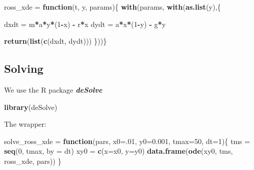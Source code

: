 \documentclass[
]{book}
\newenvironment{Shaded}{\begin{snugshade}}{\end{snugshade}}
\newcommand{\AttributeTok}[1]{\textcolor[rgb]{0.13,0.29,0.53}{#1}}
\newcommand{\ControlFlowTok}[1]{\textcolor[rgb]{0.13,0.29,0.53}{\textbf{#1}}}
\newcommand{\DecValTok}[1]{\textcolor[rgb]{0.00,0.00,0.81}{#1}}
\newcommand{\FloatTok}[1]{\textcolor[rgb]{0.00,0.00,0.81}{#1}}
\newcommand{\FunctionTok}[1]{\textcolor[rgb]{0.13,0.29,0.53}{\textbf{#1}}}
\newcommand{\NormalTok}[1]{#1}
\newcommand{\OtherTok}[1]{\textcolor[rgb]{0.56,0.35,0.01}{#1}}
\newcommand{\SpecialCharTok}[1]{\textcolor[rgb]{0.81,0.36,0.00}{\textbf{#1}}}
\begin{document}
\begin{Shaded}
\begin{Highlighting}[]
\NormalTok{ross\_xde }\OtherTok{=} \ControlFlowTok{function}\NormalTok{(t, y, params)\{}
  \FunctionTok{with}\NormalTok{(params, }\FunctionTok{with}\NormalTok{(}\FunctionTok{as.list}\NormalTok{(y),\{}
    
\NormalTok{  dxdt }\OtherTok{=}\NormalTok{ m}\SpecialCharTok{*}\NormalTok{a}\SpecialCharTok{*}\NormalTok{y}\SpecialCharTok{*}\NormalTok{(}\DecValTok{1}\SpecialCharTok{{-}}\NormalTok{x) }\SpecialCharTok{{-}}\NormalTok{ r}\SpecialCharTok{*}\NormalTok{x}
\NormalTok{  dydt }\OtherTok{=}\NormalTok{ a}\SpecialCharTok{*}\NormalTok{x}\SpecialCharTok{*}\NormalTok{(}\DecValTok{1}\SpecialCharTok{{-}}\NormalTok{y) }\SpecialCharTok{{-}}\NormalTok{ g}\SpecialCharTok{*}\NormalTok{y}
  
  \FunctionTok{return}\NormalTok{(}\FunctionTok{list}\NormalTok{(}\FunctionTok{c}\NormalTok{(dxdt, dydt)))}
\NormalTok{\}))\}}
\end{Highlighting}
\end{Shaded}

\subsection{Solving}\label{solving}

We use the R package \textbf{\emph{deSolve}}

\begin{Shaded}
\begin{Highlighting}[]
\FunctionTok{library}\NormalTok{(deSolve)}
\end{Highlighting}
\end{Shaded}

The wrapper:

\begin{Shaded}
\begin{Highlighting}[]
\NormalTok{solve\_ross\_xde }\OtherTok{=} \ControlFlowTok{function}\NormalTok{(pars, }\AttributeTok{x0=}\NormalTok{.}\DecValTok{01}\NormalTok{, }\AttributeTok{y0=}\FloatTok{0.001}\NormalTok{, }\AttributeTok{tmax=}\DecValTok{50}\NormalTok{, }\AttributeTok{dt=}\DecValTok{1}\NormalTok{)\{}
\NormalTok{  tms }\OtherTok{=} \FunctionTok{seq}\NormalTok{(}\DecValTok{0}\NormalTok{, tmax, }\AttributeTok{by =}\NormalTok{ dt)}
\NormalTok{  xy0 }\OtherTok{=} \FunctionTok{c}\NormalTok{(}\AttributeTok{x=}\NormalTok{x0, }\AttributeTok{y=}\NormalTok{y0)}
  \FunctionTok{data.frame}\NormalTok{(}\FunctionTok{ode}\NormalTok{(xy0, tms, ross\_xde, pars)) }
\NormalTok{\}}
\end{Highlighting}
\end{Shaded}
\end{document}
